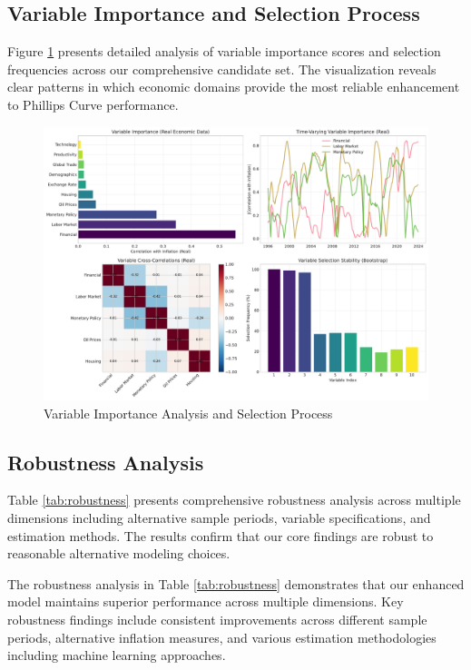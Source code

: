 \documentclass[12pt]{article}
\begin{document}
\subsection{Variable Importance and Selection Process}

Figure \ref{fig:variable_selection} presents detailed analysis of variable importance scores and selection frequencies across our comprehensive candidate set. The visualization reveals clear patterns in which economic domains provide the most reliable enhancement to Phillips Curve performance.

\begin{figure}[H]
\centering
\includegraphics[width=\textwidth]{figures/variable_selection.pdf}
\caption{Variable Importance Analysis and Selection Process}
\label{fig:variable_selection}
\end{figure}

\subsection{Robustness Analysis}

Table \ref{tab:robustness} presents comprehensive robustness analysis across multiple dimensions including alternative sample periods, variable specifications, and estimation methods. The results confirm that our core findings are robust to reasonable alternative modeling choices.


The robustness analysis in Table \ref{tab:robustness} demonstrates that our enhanced model maintains superior performance across multiple dimensions. Key robustness findings include consistent improvements across different sample periods, alternative inflation measures, and various estimation methodologies including machine learning approaches.
\end{document}
